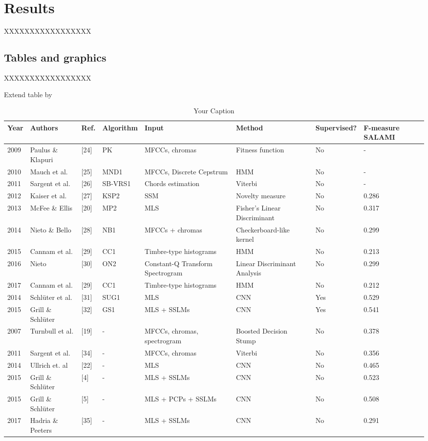\chapter{Results}

XXXXXXXXXXXXXXXXX



\section{Tables and graphics}

XXXXXXXXXXXXXXXXX

Extend table by \cite{Hernandez-Olivan2021MusicFeatures}

\begin{table}[h]
\centering
\footnotesize
\begin{tabularx}{\textwidth}{|X|X|X|X|X|X|X|X|}
\hline
Year & Authors & Ref. & Algorithm & Input & Method & Supervised? & F-measure SALAMI \\
\hline
2009 & Paulus \& Klapuri & [24] & PK & MFCCs, chromas & Fitness function & No & - \\
2010 & Mauch et al. & [25] & MND1 & MFCCs, Discrete Cepstrum & HMM & No & - \\
2011 & Sargent et al. & [26] & SB-VRS1 & Chords estimation & Viterbi & No & - \\
2012 & Kaiser et al. & [27] & KSP2 & SSM & Novelty measure & No & 0.286 \\
2013 & McFee \& Ellis & [20] & MP2 & MLS & Fisher’s Linear Discriminant & No & 0.317 \\
2014 & Nieto \& Bello & [28] & NB1 & MFCCs + chromas & Checkerboard-like kernel & No & 0.299 \\
2015 & Cannam et al. & [29] & CC1 & Timbre-type histograms & HMM & No & 0.213 \\
2016 & Nieto & [30] & ON2 & Constant-Q Transform Spectrogram & Linear Discriminant Analysis & No & 0.299 \\
2017 & Cannam et al. & [29] & CC1 & Timbre-type histograms & HMM & No & 0.212 \\
2014 & Schlüter et al. & [31] & SUG1 & MLS & CNN & Yes & 0.529 \\
2015 & Grill \& Schlüter & [32] & GS1 & MLS + SSLMs & CNN & Yes & 0.541 \\
2007 & Turnbull et al. & [19] & - & MFCCs, chromas, spectrogram & Boosted Decision Stump & No & 0.378 \\
2011 & Sargent et al. & [34] & - & MFCCs, chromas & Viterbi & No & 0.356 \\
2014 & Ullrich et. al & [22] & - & MLS & CNN & No & 0.465 \\
2015 & Grill \& Schlüter & [4] & - & MLS + SSLMs & CNN & No & 0.523 \\
2015 & Grill \& Schlüter & [5] & - & MLS + PCPs + SSLMs & CNN & No & 0.508 \\
2017 & Hadria \& Peeters & [35] & - & MLS + SSLMs & CNN & No & 0.291 \\
\hline
\end{tabularx}
\caption{Your Caption}
\label{tab:my_label}
\end{table}


